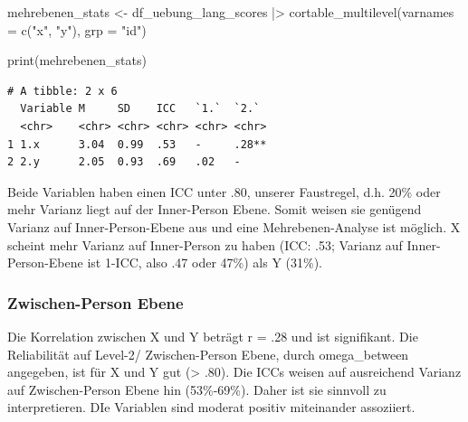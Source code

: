 \documentclass[
  letterpaper,
  DIV=11,
  numbers=noendperiod]{scrreprt}
\newenvironment{Shaded}{\begin{snugshade}}{\end{snugshade}}
\newcommand{\AttributeTok}[1]{\textcolor[rgb]{0.40,0.45,0.13}{#1}}
\newcommand{\FunctionTok}[1]{\textcolor[rgb]{0.28,0.35,0.67}{#1}}
\newcommand{\NormalTok}[1]{\textcolor[rgb]{0.00,0.23,0.31}{#1}}
\newcommand{\OtherTok}[1]{\textcolor[rgb]{0.00,0.23,0.31}{#1}}
\newcommand{\SpecialCharTok}[1]{\textcolor[rgb]{0.37,0.37,0.37}{#1}}
\newcommand{\StringTok}[1]{\textcolor[rgb]{0.13,0.47,0.30}{#1}}
\begin{document}
\begin{tcolorbox}[enhanced jigsaw, opacitybacktitle=0.6, left=2mm, colback=white, rightrule=.15mm, title=\textcolor{quarto-callout-tip-color}{\faLightbulb}\hspace{0.5em}{Lösung}, breakable, leftrule=.75mm, colframe=quarto-callout-tip-color-frame, toptitle=1mm, toprule=.15mm, titlerule=0mm, arc=.35mm, bottomtitle=1mm, colbacktitle=quarto-callout-tip-color!10!white, coltitle=black, bottomrule=.15mm, opacityback=0]

\begin{Shaded}
\begin{Highlighting}[]
\NormalTok{mehrebenen\_stats }\OtherTok{\textless{}{-}}\NormalTok{ df\_uebung\_lang\_scores }\SpecialCharTok{|\textgreater{}} 
    \FunctionTok{cortable\_multilevel}\NormalTok{(}\AttributeTok{varnames =} \FunctionTok{c}\NormalTok{(}\StringTok{"x"}\NormalTok{, }\StringTok{"y"}\NormalTok{), }\AttributeTok{grp =} \StringTok{"id"}\NormalTok{)}

\FunctionTok{print}\NormalTok{(mehrebenen\_stats)}
\end{Highlighting}
\end{Shaded}

\begin{verbatim}
# A tibble: 2 x 6
  Variable M     SD    ICC   `1.`  `2.` 
  <chr>    <chr> <chr> <chr> <chr> <chr>
1 1.x      3.04  0.99  .53   -     .28**
2 2.y      2.05  0.93  .69   .02   -    
\end{verbatim}

Beide Variablen haben einen ICC unter .80, unserer Faustregel, d.h. 20\%
oder mehr Varianz liegt auf der Inner-Person Ebene. Somit weisen sie
genügend Varianz auf Inner-Person-Ebene aus und eine Mehrebenen-Analyse
ist möglich. X scheint mehr Varianz auf Inner-Person zu haben (ICC: .53;
Varianz auf Inner-Person-Ebene ist 1-ICC, also .47 oder 47\%) als Y
(31\%).

\subsubsection{Zwischen-Person Ebene}\label{zwischen-person-ebene}

Die Korrelation zwischen X und Y beträgt r = .28 und ist signifikant.
Die Reliabilität auf Level-2/ Zwischen-Person Ebene, durch
omega\_between angegeben, ist für X und Y gut (\textgreater{} .80). Die
ICCs weisen auf ausreichend Varianz auf Zwischen-Person Ebene hin
(53\%-69\%). Daher ist sie sinnvoll zu interpretieren. DIe Variablen
sind moderat positiv miteinander assoziiert.


\end{tcolorbox}
\end{document}
